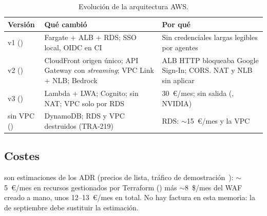 \begin{table}[tb]
\centering\footnotesize
\caption{Evolución de la arquitectura AWS.}\label{tab:06-evolucion}
\begin{tabularx}{\columnwidth}{@{}>{\raggedright\arraybackslash}p{1.45cm}YY@{}}
\toprule
Versión & Qué cambió & Por qué \\
\midrule
v1 () & Fargate + ALB + RDS; SSO local, OIDC en CI & Sin credenciales largas legibles por agentes \\
v2 () & CloudFront origen único; API Gateway con \emph{streaming}; VPC Link + NLB; Bedrock & ALB HTTP bloqueaba Google Sign-In; CORS. NAT y NLB sin aplicar \\
v3 () & Lambda + LWA; Cognito; sin NAT; VPC solo por RDS & 30~€/mes; sin salida (, NVIDIA) \\
sin VPC () & DynamoDB; RDS y VPC destruidos (TRA-219) & RDS: $\sim$15~€/mes y la VPC \\
\bottomrule
\end{tabularx}
\end{table}

\subsection{Costes}

 son estimaciones de los ADR (precios de lista, tráfico de
demostración~\cite{aws:pricing}): \mbox{$\sim$5}~€/mes en recursos gestionados por Terraform
() más \mbox{$\sim$8}~\$/mes del WAF creado a mano, unos 12--13~€/mes en total. No hay
factura en esta memoria: la de septiembre debe sustituir la estimación.

